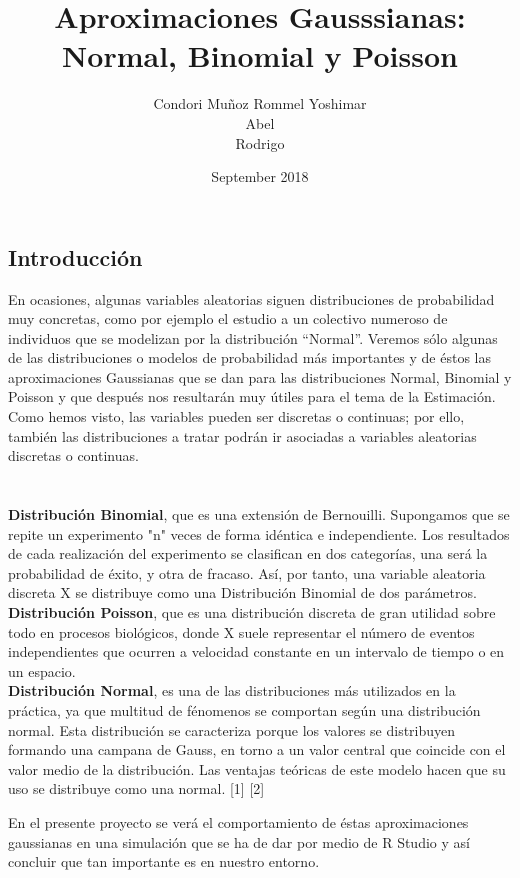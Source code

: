 \documentclass[12pt,a4paper]{article}
\title{Aproximaciones Gausssianas:\\Normal, Binomial y Poisson}
\author{Condori Muñoz Rommel Yoshimar\\Abel\\Rodrigo}
\date{September 2018}
\begin{document}
\maketitle
\begin{multicols}{2}
\section{Introducción}
    
    En ocasiones, algunas variables aleatorias siguen distribuciones de probabilidad muy concretas, como por ejemplo el estudio a un colectivo numeroso de individuos que se modelizan por la distribución “Normal”. Veremos sólo algunas de las distribuciones o modelos de probabilidad más importantes y de éstos las aproximaciones Gaussianas que se dan para las distribuciones Normal, Binomial y Poisson   y que después nos resultarán muy útiles para el tema de la Estimación.
    Como hemos visto, las variables pueden ser discretas o continuas; por ello, también las distribuciones a tratar podrán ir asociadas a variables aleatorias discretas o continuas.\\
    
    \\\\ \textbf{Distribución Binomial}, que es una extensión de Bernouilli. Supongamos que se repite un experimento "n" veces  de forma idéntica e independiente. Los resultados  de cada  realización  del experimento  se clasifican  en dos categorías, una será la probabilidad de éxito,  y otra de fracaso. Así, por tanto, una variable aleatoria discreta X se distribuye como una Distribución Binomial  de dos parámetros.
    \\ \textbf{Distribución Poisson}, que es una distribución discreta de gran utilidad  sobre todo en procesos biológicos, donde X suele representar el número  de eventos independientes que ocurren a velocidad constante en un intervalo de tiempo o en un espacio.
    \\ \textbf{Distribución Normal}, es una de las distribuciones más utilizados  en la práctica, ya que  multitud  de fénomenos se comportan según  una distribución normal. Esta distribución se caracteriza porque los valores  se distribuyen  formando una campana de Gauss, en torno  a un valor central que coincide con el valor  medio de la distribución. Las ventajas teóricas de este modelo hacen que su uso se distribuye como una normal.
    [1] [2]
    
    En el presente proyecto se verá el comportamiento de éstas aproximaciones gaussianas en una simulación  que se ha de dar por medio de R Studio y así concluir que tan importante es en nuestro entorno.
    

\end{multicols}
\end{document}
